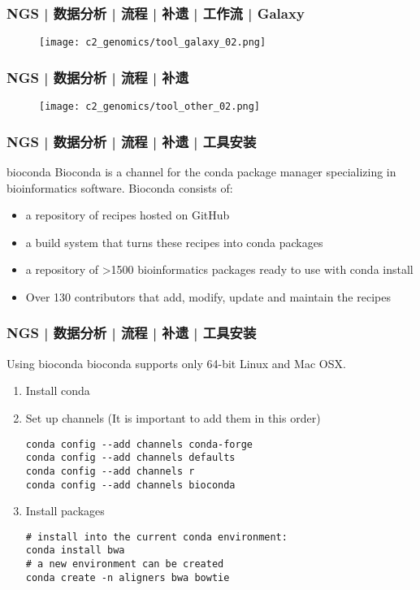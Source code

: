 \begin{frame}
  \frametitle{NGS | 数据分析 | 流程 | 补遗 | 工作流 | Galaxy}
  \begin{figure}
    \centering
    \texttt{[image: c2\_genomics/tool\_galaxy\_02.png]}
  \end{figure}
\end{frame}

\begin{frame}
  \frametitle{NGS | 数据分析 | 流程 | 补遗}
  \begin{figure}
    \centering
    \texttt{[image: c2\_genomics/tool\_other\_02.png]}
  \end{figure}
\end{frame}

\begin{frame}
  \frametitle{NGS | 数据分析 | 流程 | 补遗 | 工具安装}
  \begin{block}{\alert{bioconda}}
    Bioconda is a channel for the conda package manager specializing in bioinformatics software. Bioconda consists of:
    \begin{itemize}
      \item a repository of recipes hosted on GitHub
      \item a build system that turns these recipes into conda packages
      \item a repository of >1500 bioinformatics packages ready to use with conda install
      \item Over 130 contributors that add, modify, update and maintain the recipes
    \end{itemize}
  \end{block}
\end{frame}

\begin{frame}[fragile]
  \frametitle{NGS | 数据分析 | 流程 | 补遗 | 工具安装}
  \begin{block}{Using bioconda}
    bioconda supports only 64-bit Linux and Mac OSX.
    \begin{enumerate}
      \item Install conda
      \item Set up channels (It is important to add them in this order)
\vspace{-0.5em}
\begin{lstlisting}
conda config --add channels conda-forge
conda config --add channels defaults
conda config --add channels r
conda config --add channels bioconda
\end{lstlisting}
\vspace{-0.8em}
      \item Install packages
\vspace{-0.5em}
\begin{lstlisting}
# install into the current conda environment:
conda install bwa
# a new environment can be created
conda create -n aligners bwa bowtie
\end{lstlisting}
    \end{enumerate}
  \end{block}
\end{frame}


